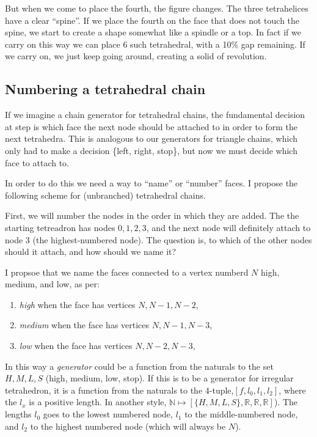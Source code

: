 \documentclass[11pt]{article}
\begin{document}
But when we come to place the fourth, the figure changes. The three tetrahelices have a clear ``spine''. If we
place the fourth on the face that does not touch the spine, we start to create a shape somewhat like a spindle or a top.
In fact if we carry on this way we can place 6 such tetrahedral, with a 10\% gap remaining. If we carry on, we just keep
going around, creating a solid of revolution.

\subsection{Numbering a tetrahedral chain}

If we imagine a chain generator for tetrahedral chains, the fundamental decision at step is which face the next node should be attached to in order
to form the next tetrahedra. This is analogous to our generators for triangle chains, which only had to make a decision \{left, right, stop\}, but
now we must decide which face to attach to.

In order to do this we need a way to ``name'' or ``number'' faces. I propose the following scheme for (unbranched) tetrahedral chains.

First, we will number the nodes in the order in which they are added. The the starting tetreadron has nodes ${0,1,2,3}$, and the next
node will definitely attach to node $3$ (the highest-numbered node). The question is, to which of the other nodes should it attach,
and how should we name it?

I propsoe that we name the faces connected to a vertex numberd $N$ high, medium, and low, as per:
\begin{enumerate}
\item {\em high} when the face has vertices ${N, N-1, N-2}$,
\item {\em medium} when the face has vertices ${N, N-1, N-3}$,
  \item {\em low} when the face has vertices ${N, N-2, N-3}$,    
\end{enumerate}

In this way a {\em generator} could be a function from the naturals to the set ${H,M,L,S}$ (high, medium, low, stop). If this is to be
a generator for irregular tetrahedron, it is a function from the naturals to the 4-tuple,$[f,l_0,l_1,l_2]$, where the $l_x$ is a positive length.
In another style, $\mathbb{N} \mapsto [\{H,M,L,S\},\mathbb{R},\mathbb{R},\mathbb{R}]$). The lengths $l_0$ goes to the lowest numbered node, $l_1$ to the middle-numbered node,
and $l_2$ to the highest numbered node (which will always be $N$).
\end{document}
